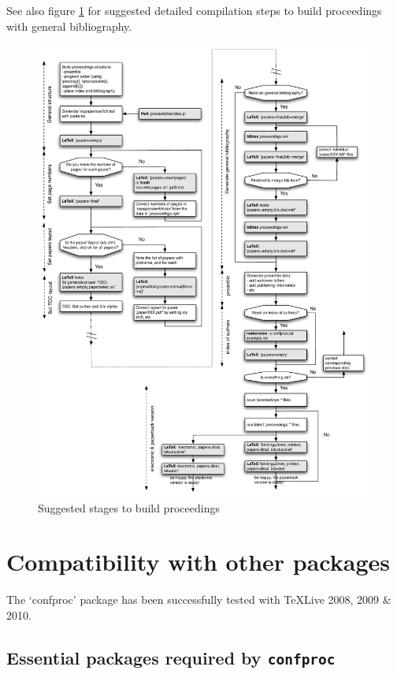 \documentclass{article}
\newcommand{\filename}{confproc}
\newcommand{\package}[1]{\texttt{#1}}
\begin{document}
See also figure \ref{fig:confproc_diag} for suggested detailed compilation steps to build proceedings with general bibliography.
\begin{figure}[htbp]
	   \includegraphics[width=\textwidth]{confproc_diag.pdf} 
	   \caption{Suggested stages to build proceedings}
	   \label{fig:confproc_diag}
\end{figure}


\section{Compatibility with other packages}

The `confproc' package has been successfully tested with \TeX{}Live 2008, 2009 \& 2010.

\subsection{Essential packages required by \package{\filename}}
\end{document}
